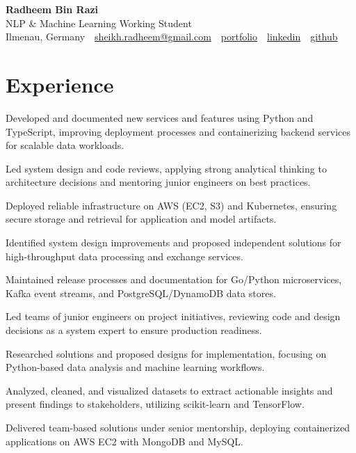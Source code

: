 \documentclass[11pt,a4paper]{resume}
\makeatletter
\newcommand{\Portfolio}{https://radheem.github.io/my-cv}
\newcommand{\PortfolioText}{portfolio}
\newcommand{\GitHub}{https://github.com/radheem}
\newcommand{\LinkedIn}{https://www.linkedin.com/in/radheem-razi}
\newcommand{\Email}{sheikh.radheem@gmail.com}
\makeatother
\begin{document}
\begin{center}
  {\huge\bfseries Radheem Bin Razi}\\[3pt]
  {\large NLP \& Machine Learning Working Student}\\[6pt]
  \small
  Ilmenau, Germany \,\textbar\,
  \href{mailto:\Email}{\Email} \,\textbar\,
  \href{\Portfolio}{\PortfolioText} \,\textbar\,
  \href{\LinkedIn}{linkedin} \,\textbar\,
  \href{\GitHub}{github}
\end{center}
\vspace{2pt}

\section{Experience}

\bullets
  \item Developed and documented new services and features using Python and TypeScript, improving deployment processes and containerizing backend services for scalable data workloads.
  \item Led system design and code reviews, applying strong analytical thinking to architecture decisions and mentoring junior engineers on best practices.
  \item Deployed reliable infrastructure on AWS (EC2, S3) and Kubernetes, ensuring secure storage and retrieval for application and model artifacts.
\bulletsend
\vspace{3pt}
\bullets
  \item Identified system design improvements and proposed independent solutions for high-throughput data processing and exchange services.
  \item Maintained release processes and documentation for Go/Python microservices, Kafka event streams, and PostgreSQL/DynamoDB data stores.
  \item Led teams of junior engineers on project initiatives, reviewing code and design decisions as a system expert to ensure production readiness.
\bulletsend
\vspace{3pt}
\bullets
  \item Researched solutions and proposed designs for implementation, focusing on Python-based data analysis and machine learning workflows.
  \item Analyzed, cleaned, and visualized datasets to extract actionable insights and present findings to stakeholders, utilizing scikit-learn and TensorFlow.
  \item Delivered team-based solutions under senior mentorship, deploying containerized applications on AWS EC2 with MongoDB and MySQL.
\bulletsend
\vspace{3pt}
\end{document}
